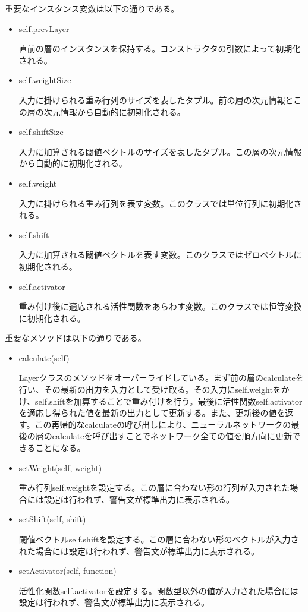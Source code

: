 \documentclass{ujarticle} %
\begin{document}
重要なインスタンス変数は以下の通りである。
\begin{itemize}
  \item self.prevLayer

  直前の層のインスタンスを保持する。コンストラクタの引数によって初期化される。

  \item self.weightSize

  入力に掛けられる重み行列のサイズを表したタプル。前の層の次元情報とこの層の次元情報から自動的に初期化される。

  \item self.shiftSize

  入力に加算される閾値ベクトルのサイズを表したタプル。この層の次元情報から自動的に初期化される。

  \item self.weight

  入力に掛けられる重み行列を表す変数。このクラスでは単位行列に初期化される。

  \item self.shift

  入力に加算される閾値ベクトルを表す変数。このクラスではゼロベクトルに初期化される。

  \item self.activator

  重み付け後に適応される活性関数をあらわす変数。このクラスでは恒等変換に初期化される。
\end{itemize}

重要なメソッドは以下の通りである。

\begin{itemize}
  \item calculate(self)

  Layerクラスのメソッドをオーバーライドしている。まず前の層のcalculateを行い、その最新の出力を入力として受け取る。その入力にself.weightをかけ、self.shiftを加算することで重み付けを行う。最後に活性関数self.activatorを適応し得られた値を最新の出力として更新する。また、更新後の値を返す。この再帰的なcalculateの呼び出しにより、ニューラルネットワークの最後の層のcalculateを呼び出すことでネットワーク全ての値を順方向に更新できることになる。

  \item setWeight(self, weight)

  重み行列self.weightを設定する。この層に合わない形の行列が入力された場合には設定は行われず、警告文が標準出力に表示される。

  \item setShift(self, shift)

  閾値ベクトルself.shiftを設定する。この層に合わない形のベクトルが入力された場合には設定は行われず、警告文が標準出力に表示される。

  \item setActivator(self, function)

  活性化関数self.activatorを設定する。関数型以外の値が入力された場合には設定は行われず、警告文が標準出力に表示される。
\end{itemize}
\end{document}
